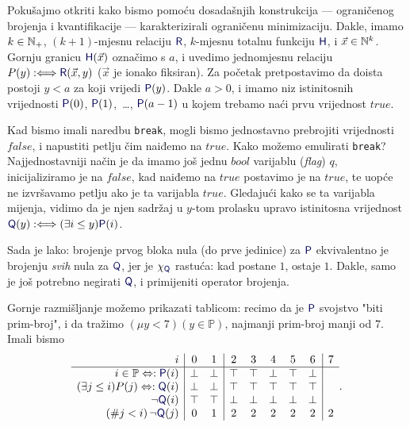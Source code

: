 
Pokušajmo otkriti kako bismo pomoću dosadašnjih konstrukcija --- ograničenog brojenja i kvantifikacije --- karakterizirali ograničenu minimizaciju. Dakle, imamo $k\in{\mathbb N}_+$, $(k+1)$-mjesnu relaciju $\f R$, $k$-mjesnu totalnu funkciju $\f H$, i $\vec x\in{\mathbb N}^k$. Gornju granicu $\f H(\vec x)$ označimo s $a$, i uvedimo jednomjesnu relaciju $P(y):\Longleftrightarrow\f R(\vec x,y)$ ($\vec x$ je ionako fiksiran). Za početak pretpostavimo da doista postoji $y<a$ za koji vrijedi $\f P(y)$. Dakle $a>0$, i imamo niz istinitosnih vrijednosti $\f P(0)$, $\f P(1)$,~\ldots, $\f P(a-1)$ u kojem trebamo naći prvu vrijednost $\mathit{true}$.

Kad bismo imali naredbu \texttt{break}, mogli bismo jednostavno prebrojiti vrijednosti $\mathit{false}$, i napustiti petlju čim naiđemo na $\mathit{true}$. Kako možemo emulirati \texttt{break}? Najjednostavniji način je da imamo još jednu $bool$ varijablu (\emph{flag}) $q$, inicijaliziramo je na $\mathit{false}$, kad naiđemo na $\mathit{true}$ postavimo je na $\mathit{true}$, te uopće ne izvršavamo petlju ako je ta varijabla $\mathit{true}$. Gledajući kako se ta varijabla mijenja, vidimo da je njen sadržaj u $y$-tom prolasku upravo istinitosna vrijednost $\f Q(y):\Longleftrightarrow(\exists i\le y)\f P(i)$.

Sada je lako: brojenje prvog bloka nula (do prve jedinice) za $\f P$ ekvivalentno je brojenju \emph{svih} nula za $\f Q$, jer je $\chi_{\f Q}$ rastuća: kad postane $1$, ostaje $1$. Dakle, samo je još potrebno negirati $\f Q$, i primijeniti operator brojenja.

Gornje razmišljanje možemo prikazati tablicom: recimo da je $\f P$ svojstvo "biti prim-broj", i da tražimo $(\mu y<7)(y\in\mathbb P)$, najmanji prim-broj manji od $7$. Imali bismo
\begin{equation}
    \begin{array}{r|cc|ccccc|c}
i & 0 & 1 & 2 & 3 & 4 & 5 & 6 & 7 \\\hline
i\in\mathbb P\Leftrightarrow:\f P(i) & \bot & \bot & \top & \top & \bot & \top & \bot  \\
(\exists j\le i)P(j)\Leftrightarrow:\f Q(i) & \bot & \bot & \top & \top & \top & \top & \top \\
\lnot\f Q(i) & \top & \top & \bot & \bot & \bot & \bot & \bot\\
(\# j<i)\,\lnot\f Q(j) & 0 & 1 & 2 & 2 & 2 & 2 & 2 & 2
\end{array}\text.
\end{equation}

